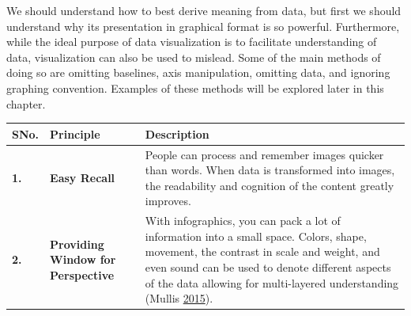\documentclass[]{book}
\begin{document}
We should understand how to best derive meaning from data, but first we should understand why its presentation in graphical format is so powerful. Furthermore, while the ideal purpose of data visualization is to facilitate understanding of data, visualization can also be used to mislead. Some of the main methods of doing so are omitting baselines, axis manipulation, omitting data, and ignoring graphing convention. Examples of these methods will be explored later in this chapter.

\begin{longtable}[]{@{}lll@{}}
\toprule
\begin{minipage}[b]{0.04\columnwidth}\raggedright
\textbf{SNo.}\strut
\end{minipage} & \begin{minipage}[b]{0.10\columnwidth}\raggedright
\textbf{Principle}\strut
\end{minipage} & \begin{minipage}[b]{0.76\columnwidth}\raggedright
\textbf{Description}\strut
\end{minipage}\tabularnewline
\midrule
\endhead
\begin{minipage}[t]{0.04\columnwidth}\raggedright
\textbf{1.}\strut
\end{minipage} & \begin{minipage}[t]{0.10\columnwidth}\raggedright
\textbf{Easy Recall}\strut
\end{minipage} & \begin{minipage}[t]{0.76\columnwidth}\raggedright
People can process and remember images quicker than words. When data is transformed into images, the readability and cognition of the content greatly improves.\strut
\end{minipage}\tabularnewline
\begin{minipage}[t]{0.04\columnwidth}\raggedright
\textbf{2.}\strut
\end{minipage} & \begin{minipage}[t]{0.10\columnwidth}\raggedright
\textbf{Providing Window for Perspective}\strut
\end{minipage} & \begin{minipage}[t]{0.76\columnwidth}\raggedright
With infographics, you can pack a lot of information into a small space. Colors, shape, movement, the contrast in scale and weight, and even sound can be used to denote different aspects of the data allowing for multi-layered understanding (Mullis \protect\hyperlink{ref-image_good}{2015}).\strut
\end{minipage}\tabularnewline

\end{longtable}
\end{document}
